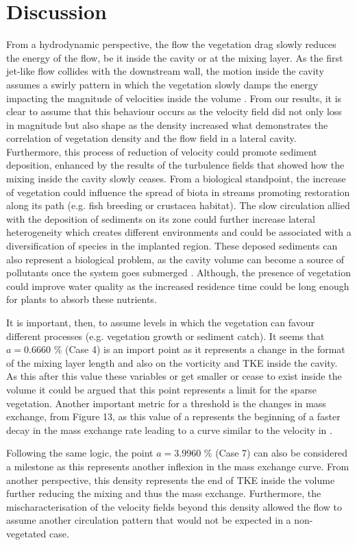 \section{Discussion}
From a hydrodynamic perspective, the flow the vegetation drag slowly reduces the energy of the flow, be it inside the cavity or at the mixing layer. As the first jet-like flow collides with the downstream wall, the motion inside the cavity assumes a swirly pattern in which the vegetation slowly damps the energy impacting the magnitude of velocities inside the volume \cite{sukhodolov2017}. From our results, it is clear to assume that this behaviour occurs as the velocity field did not only loss in magnitude but also shape as the density increased what demonstrates the correlation of vegetation density and the flow field in a lateral cavity. Furthermore, this process of reduction of velocity could promote sediment deposition, enhanced by the results of the turbulence fields that showed how the mixing inside the cavity slowly ceases. From a biological standpoint, the increase of vegetation could influence the spread of biota in streams promoting restoration along its path (e.g. fish breeding or crustacea habitat). The slow circulation allied with the deposition of sediments on its zone could further increase lateral heterogeneity which creates different environments and could be associated with a diversification of species in the implanted region. These deposed sediments can also represent a biological problem, as the cavity volume can become a source of pollutants once the system goes submerged \cite{weitbrecht2004}. Although, the presence of vegetation could improve water quality as the increased residence time could be long enough for plants to absorb these nutrients.

It is important, then, to assume levels in which the vegetation can favour different processes (e.g. vegetation growth or sediment catch). It seems that $a = 0.6660$ \% (Case 4) is an import point as it represents a change in the format of the mixing layer length and also on the vorticity and TKE inside the cavity. As this after this value these variables or get smaller or cease to exist inside the volume it could be argued that this point represents a limit for the sparse vegetation. Another important metric for a threshold is the changes in mass exchange, from Figure 13, as this value of a represents the beginning of a faster decay in the mass exchange rate leading to a curve similar to the velocity in \textcite{chen2012}.

Following the same logic, the point $a = 3.9960$ \% (Case 7) can also be considered a milestone as this represents another inflexion in the mass exchange curve. From another perspective, this density represents the end of TKE inside the volume further reducing the mixing and thus the mass exchange. Furthermore, the mischaracterisation of the velocity fields beyond this density allowed the flow to assume another circulation pattern that would not be expected in a non-vegetated case.

